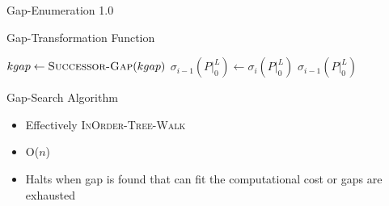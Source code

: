 \documentclass{beamer}
\begin{document}
\begin{section}{Gap-Enumeration 1.0}
\begin{frame}{Gap-Transformation Function\autocite[12]{BelwalCheng}}
\begin{algorithm}[H]
\begin{multicols}{2}
{\begin{algorithmic}[2]
                  \State \Call{Gap-Insert}{$\sigma_{i}(P|_{0}^{L}), [t_{1},t)$}
                  \ExitWhile
                \EndIf
                  \State \Call{Gap-Insert}{$\sigma_{i}(P|_{0}^{L}), [t_{1},t)$}
                  \State \Call{Gap-Insert}{$\sigma_{i}(P|_{0}^{L}), [t + C_{j},t_{2})$}
                  \ExitWhile
                \EndIf
                  \State \Call{Gap-Insert}{$\sigma_{i}(P|_{0}^{L}), [t_{1},t)$}
                \EndIf
              \EndIf
                \State $kgap \gets \Call{Successor-Gap}{kgap}$
              \EndIf
            \EndWhile
          \EndFor
          \State $\sigma_{i-1}(P|_{0}^{L}) \gets \sigma_{i}(P|_{0}^{L})$
          \State \Return $\sigma_{i-1}(P|_{0}^{L})$
        \EndFunction
      \end{algorithmic}
    }
  \end{multicols}
  \end{algorithm}
\end{frame}
\begin{frame}{Gap-Search Algorithm\autocite[12-13]{BelwalCheng}}
  \begin{itemize}
  \item{Effectively \textsc{InOrder-Tree-Walk\autocite[245-246]{CLR}}}
  \item{O($n$)}
  \item{Halts when gap is found that can fit the computational cost or gaps are exhausted}
  \end{itemize}
\end{frame}
\end{section}
\end{document}
